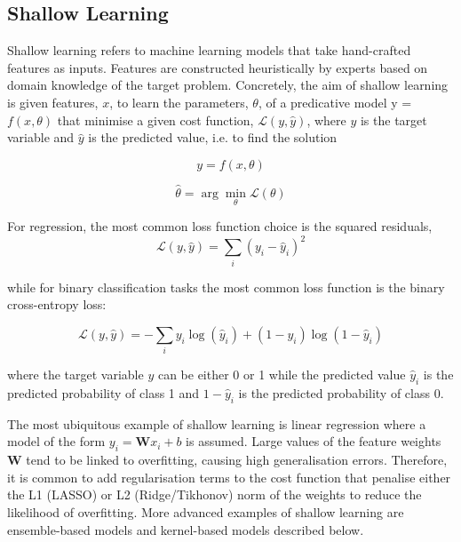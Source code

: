\subsection{Shallow Learning}

Shallow learning refers to machine learning models that take hand-crafted features as inputs. Features are constructed heuristically by experts based on domain knowledge of the target problem. Concretely, the aim of shallow learning is given features, $x$, to learn the parameters, $\theta$, of a predicative model y = $f (x, \theta)$ that minimise a given cost function, $\mathcal{L}(y, \hat{y})$, where $y$ is the target variable and $\hat{y}$ is the predicted value, i.e. to find the solution

\begin{equation}
    y = f(x, \theta)
\end{equation}

\begin{equation}
    \hat{\theta} = \arg\min_{\theta} \mathcal{L}(\theta)
\end{equation}

For regression, the most common loss function choice is the squared residuals,
\begin{equation}
    \mathcal{L}(y, \hat{y}) = \sum_{i}(y_i - \hat{y}_i)^{2}
\end{equation}

while for binary classification tasks the most common loss function is the binary cross-entropy loss:

\begin{equation}
    \mathcal{L}(y, \hat{y}) = -\sum_{i}y_i\log(\hat{y}_i) + (1 - y_i)\log(1 - \hat{y}_i)
\end{equation}

where the target variable $y$ can be either 0 or 1 while the predicted value $\hat{y}_i$ is the predicted probability of class 1 and $1-\hat{y}_i$ is the predicted probability of class 0.

The most ubiquitous example of shallow learning is linear regression where a model of the form $y_{i} = \textbf{W}x_{i} + b$ is assumed. Large values of the feature weights $\textbf{W}$ tend to be linked to overfitting, causing high generalisation errors. Therefore, it is common to add regularisation terms to the cost function that penalise either the L1 (LASSO) or L2 (Ridge/Tikhonov) norm of the weights to reduce the likelihood of overfitting. More advanced examples of shallow learning are ensemble-based models and kernel-based models described below.

